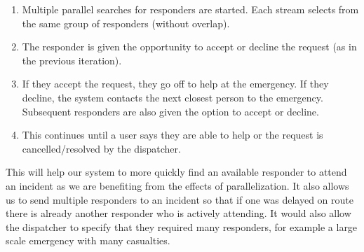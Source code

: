 \documentclass{article}
\begin{document}
	\begin{enumerate}
  		\item Multiple parallel searches for responders are started. Each stream selects from the same group of responders (without overlap).
  		\item The responder is given the opportunity to accept or decline the request (as in the previous iteration).
  		\item If they accept the request, they go off to help at the emergency. If they decline, the system contacts the next closest person to the emergency. Subsequent responders are also given the option to accept or decline.
  		\item This continues until a user says they are able to help or the request is cancelled/resolved by the dispatcher.
	\end{enumerate}
	This will help our system to more quickly find an available responder to attend an incident as we are benefiting from the effects of parallelization. It also allows us to send multiple responders to an incident so that if one was delayed on route there is already another responder who is actively attending. It would also allow the dispatcher to specify that they required many responders, for example a large scale emergency with many casualties.\\
	
\end{document}
